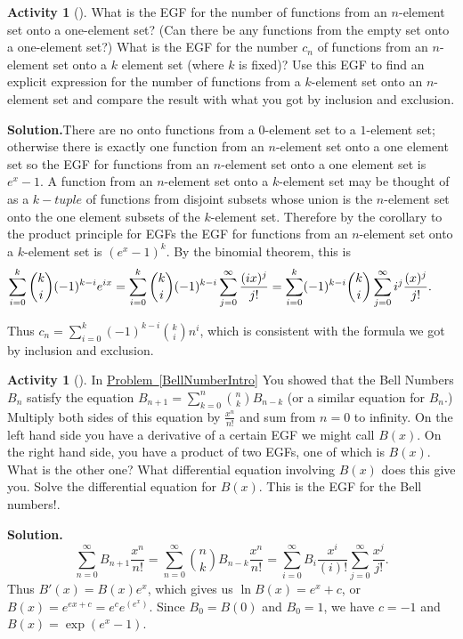\documentclass[10pt,]{book}
\theoremstyle{plain}
\theoremstyle{definition}
\newtheorem{activity}[project]{Activity}
\numberwithin{equation}{chapter}
\begin{document}
\begin{activity}[]\label{activity-365}
What is the EGF for the number of functions from an \(n\)-element set onto a one-element set? (Can there be any functions from the empty set onto a one-element set?) What is the EGF for the number \(c_n\) of functions from an \(n\)-element set onto a \(k\) element set (where \(k\) is fixed)? Use this EGF to find an explicit expression for the number of functions from a \(k\)-element set onto an \(n\)-element set and compare the result with what you got by inclusion and exclusion.%
\par\medskip\noindent%
\textbf{Solution.}\quad There are no onto functions from a \(0\)-element set to a \(1\)-element set; otherwise there is exactly one function from an \(n\)-element set onto a one element set so the EGF for functions from an \(n\)-element set onto a one element set is \(e^x-1\). A function from an \(n\)-element set onto a \(k\)-element set may be thought of as a \(k-tuple\) of functions from disjoint subsets whose union is the \(n\)-element set onto the one element subsets of the \(k\)-element set. Therefore by the corollary to the product principle for EGFs the EGF for functions from an \(n\)-element set onto a \(k\)-element set is \((e^x-1)^k\). By the binomial theorem, this is%
\begin{equation*}
\kern-.25 in\sum_{i=0}^k\binom{k}{i}(-1)^{k-i}e^{ix}
=
\sum_{i=0}^k \binom{k}{i} (-1)^{k-i} \sum_{j=0}^\infty \frac{(ix)^j}{j!} =
\sum_{i=0}^k (-1)^{k-i}\binom{k}{i} \sum_{j=0}^\infty i^j\frac{(x)^j}{j!}.
\end{equation*}
%
\par
Thus \(c_n= \sum_{i=0}^k(-1)^{k-i}\binom{k}{i}n^i\), which is consistent with the formula we got by inclusion and exclusion.%
\end{activity}
\begin{activity}[]\label{BellNumbersEGF}
In \hyperref[BellNumberIntro]{Problem~\ref{BellNumberIntro}} You showed that the Bell Numbers \(B_n\) satisfy the equation \(B_{n+1} =
\sum_{k=0}^{n} \binom{n}{k}B_{n-k}\) (or a similar equation for \(B_n\).) Multiply both sides of this equation by \(\frac{x^n}{n!}\) and sum from \(n=0\) to infinity. On the left hand side you have a derivative of a certain EGF we might call \(B(x)\). On the right hand side, you have a product of two EGFs, one of which is \(B(x)\). What is the other one? What differential equation involving \(B(x)\) does this give you. Solve the differential equation for \(B(x)\). This is the EGF for the Bell numbers!.%
\par\medskip\noindent%
\textbf{Solution.}\quad %
\begin{equation*}
\sum_{n=0}^\infty B_{n+1}\frac{x^n}{n!} = \sum_{n=0}^\infty\binom{n}{k}B_{n-k}\frac{x^n}{n!} =\sum_{i=0}^\infty B_{i}\frac{x^{i}}{(i)!}\sum_{j=0}^\infty \frac{x^j}{j!}.
\end{equation*}
Thus \(B'(x) = B(x)e^x\), which gives us \(\ln B(x) = e^x+c\), or \(B(x) =
e^{ex+c} =e^ce^{(e^x)}\). Since \(B_0=B(0)\) and \(B_0=1\), we have \(c=-1\) and \(B(x) = \exp(e^x-1)\).%
\end{activity}
\end{document}
